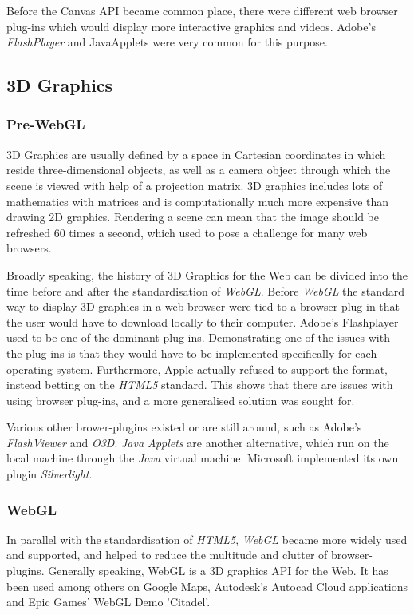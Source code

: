 \documentclass[a4paper,11pt,twoside]{article}
\begin{document}
Before the Canvas API became common place, there were different web browser plug-ins which would display more interactive graphics and videos. Adobe's \textit{FlashPlayer} and JavaApplets were very common for this purpose.



\subsection{3D Graphics}

\subsubsection{Pre-WebGL}

3D Graphics are usually defined by a space in Cartesian coordinates in which reside three-dimensional objects, as well as a camera object through which the scene is viewed with help of a projection matrix. 3D graphics includes lots of mathematics with matrices and is computationally much more expensive than drawing 2D graphics. Rendering a scene can mean that the image should be refreshed 60 times a second, which used to pose a challenge for many web browsers.

Broadly speaking, the history of 3D Graphics for the Web can be divided into the time before and after the standardisation of \textit{WebGL}. Before \textit{WebGL} the standard way to display 3D graphics in a web browser were tied to a browser plug-in that the user would have to download locally to their computer. Adobe's Flashplayer used to be one of the dominant plug-ins. Demonstrating one of the issues with the plug-ins is that they would have to be implemented specifically for each operating system. Furthermore, Apple actually refused to support the format, instead betting on the \textit{HTML5} standard. This shows that there are issues with using browser plug-ins, and a more generalised solution was sought for.

Various other brower-plugins existed or are still around, such as Adobe's \textit{FlashViewer} and \textit{O3D}. \textit{Java Applets} are another alternative, which run on the local machine through the \textit{Java} virtual machine. Microsoft implemented its own plugin \textit{Silverlight}.


\subsubsection{WebGL}

In parallel with the standardisation of \textit{HTML5}, \textit{WebGL} became more widely used and supported, and helped to reduce the multitude and clutter of browser-plugins. Generally speaking, WebGL is a 3D graphics API for the Web. It has been used among others on Google Maps, Autodesk's Autocad Cloud applications and Epic Games' WebGL Demo 'Citadel'.
\end{document}
